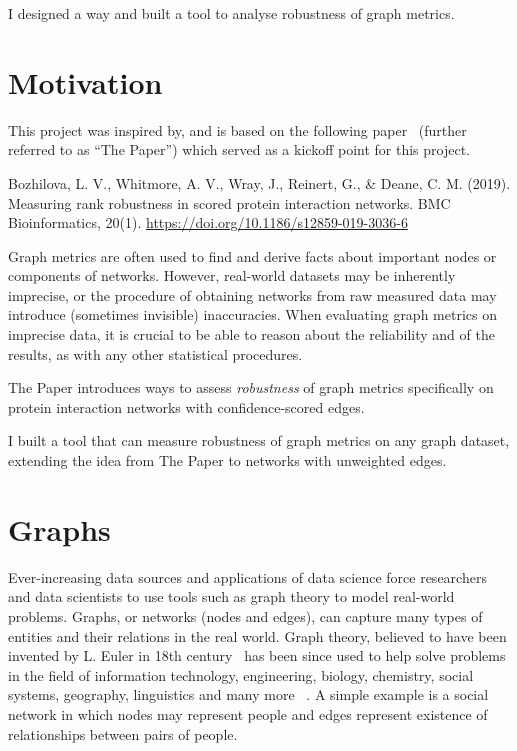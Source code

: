 I designed a way and built a tool to analyse robustness of graph metrics.

\section{Motivation}

This project was inspired by, and is based on the following paper~\cite{Bozhilova2019} (further referred to as ``The Paper'') which served as a kickoff point for this project.
\begin{adjustwidth}{1cm}{}
    \vspace*{0.5em}
    Bozhilova, L. V., Whitmore, A. V., Wray, J., Reinert, G., \& Deane, C. M. (2019). Measuring rank robustness in scored protein interaction networks. BMC Bioinformatics, 20(1). \url{https://doi.org/10.1186/s12859-019-3036-6}
    \vspace*{0.5em}
\end{adjustwidth}

Graph metrics are often used to find and derive facts about important nodes or components of networks.
However, real-world datasets may be inherently imprecise, or the procedure of obtaining networks from raw measured data may introduce (sometimes invisible) inaccuracies.
When evaluating graph metrics on imprecise data, it is crucial to be able to reason about the reliability and of the results, as with any other statistical procedures.

The Paper introduces ways to assess \textsl{robustness} of graph metrics specifically on protein interaction networks with confidence-scored edges.

I built a tool that can measure robustness of graph metrics on any graph dataset, extending the idea from The Paper to networks with unweighted edges.

\section{Graphs}

Ever-increasing data sources and applications of data science force researchers and data scientists to use tools such as graph theory to model real-world problems.
Graphs, or networks (nodes and edges), can capture many types of entities and their relations in the real world.
Graph theory, believed to have been invented by L. Euler in 18th century~\cite{BiggsGraphTheory173619361986} has been since used to help solve problems in the field of information technology, engineering, biology, chemistry, social systems, geography, linguistics and many more ~\cite{FouldsGraphTheoryApplications2012}.
A simple example is a social network in which nodes may represent people and edges represent existence of relationships between pairs of people.



